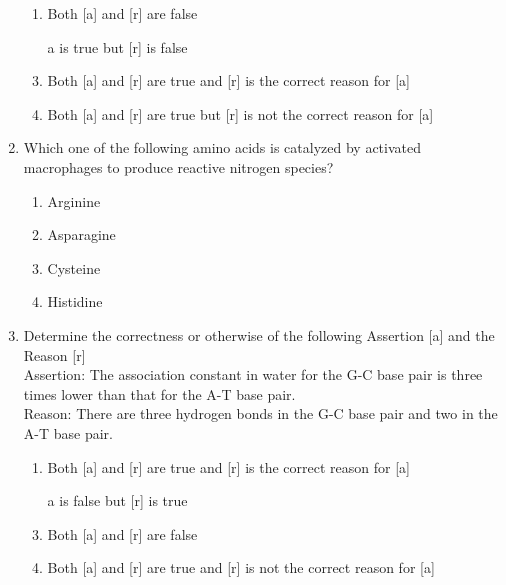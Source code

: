 \documentclass[journal,12pt,onecolumn]{IEEEtran}
\theoremstyle{remark}
\begin{document}
\begin{enumerate}
    \begin{enumerate}
        \item Both [a] and [r] are false
        \item [a] is true but [r] is false
        \item Both [a] and [r] are true and [r] is the correct reason for [a]
        \item Both [a] and [r] are true but [r] is not the correct reason for [a]
    \end{enumerate}
    \item Which one of the following amino acids is catalyzed by activated macrophages to produce reactive nitrogen species?
    \begin{multicols}{2}
    \begin{enumerate}
        \item Arginine
        \item Asparagine
        \item Cysteine
        \item Histidine
    \end{enumerate}
    \end{multicols}

    \item Determine the correctness or otherwise of the following Assertion [a] and the Reason [r]\\
    Assertion: The association constant in water for the G-C base pair is three times lower than that for the A-T base pair.\\
    Reason: There are three hydrogen bonds in the G-C base pair and two in the A-T base pair.
    \begin{multicols}{2}
    \begin{enumerate}
        \item Both [a] and [r] are true and [r] is the correct reason for [a]
        \item [a] is false but [r] is true
        \item Both [a] and [r] are false
        \item Both [a] and [r] are true and [r] is not the correct reason for [a]
    \end{enumerate}
    \end{multicols}


\end{enumerate}
\end{document}

